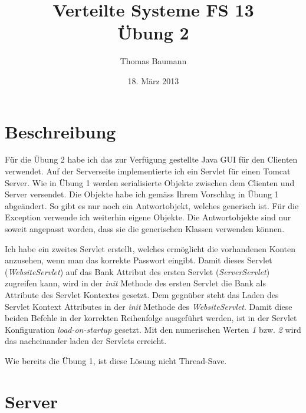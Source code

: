 \documentclass[10pt]{article}
\title{
	\vspace{5cm}
	Verteilte Systeme FS 13\\
	Übung 2
}
\author{Thomas Baumann}
\date{18. März 2013}
\newcommand{\Kursiv}[1]{\textit{#1}} %
\let\stdsection\section{}
\renewcommand{\section}{\newpage\stdsection}
\begin{document}
\maketitle
\thispagestyle{fancy}

\newpage

\tableofcontents	  	


\newpage
\setcounter{page}{1}

\section{Beschreibung}
Für die Übung 2 habe ich das zur Verfügung gestellte Java GUI für den Clienten verwendet. 
Auf der Serverseite implementierte ich ein Servlet für einen Tomcat Server. Wie in Übung 1
werden serialisierte Objekte zwischen dem Clienten und Server versendet. Die Objekte 
habe ich gemäss Ihrem Vorschlag in Übung 1 abgeändert. So gibt es nur noch ein 
Antwortobjekt, welches generisch ist. Für die Exception verwende ich weiterhin eigene 
Objekte. Die Antwortobjekte sind nur soweit angepasst worden, dass sie die generischen 
Klassen verwenden können.

Ich habe ein zweites Servlet erstellt, welches ermöglicht die vorhandenen Konten anzusehen, 
wenn man das korrekte Passwort eingibt. Damit dieses Servlet (\Kursiv{WebsiteServlet}) auf 
das Bank Attribut des ersten Servlet (\Kursiv{ServerServlet}) zugreifen kann, wird in der 
\Kursiv{init} Methode des ersten Servlet die Bank als Attribute des Servlet Kontextes 
gesetzt. Dem gegnüber steht das Laden des Servlet Kontext Attributes in der \Kursiv{init} 
Methode des \Kursiv{WebsiteServlet}. Damit diese beiden Befehle in der korrekten 
Reihenfolge ausgeführt werden, ist in der Servlet Konfiguration \Kursiv{load-on-startup} 
gesetzt. Mit den numerischen Werten \Kursiv{1} bzw. \Kursiv{2} wird das nacheinander laden 
der Servlets erreicht.

Wie bereits die Übung 1, ist diese Lösung nicht Thread-Save.

\section{Server}



\end{document}

